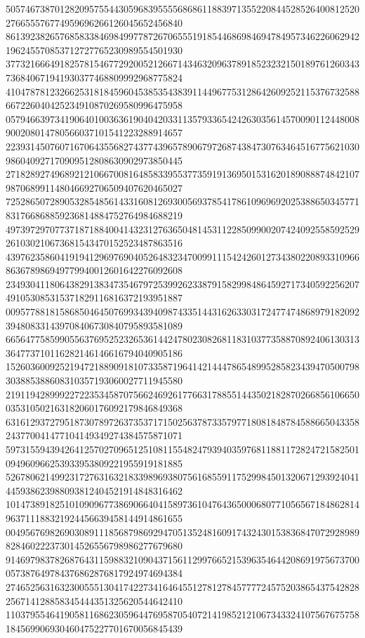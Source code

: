 \begin{DoxyCode}
      505746738701282095755443059683955556868611883971355220844528526400812520276655576774959696266126045652456840
      861392382657685833846984997787267065551918544686984694784957346226062942196245570853712727765230989554501930
      377321666491825781546772920052126671434632096378918523232150189761260343736840671941930377468809992968775824
      410478781232662531818459604538535438391144967753128642609252115376732588667226040425234910870269580996475958
      057946639734190640100363619040420331135793365424263035614570090112448008900208014780566037101541223288914657
      223931450760716706435568274377439657890679726874384730763464516775621030986040927170909512808630902973850445
      271828927496892121066700816485833955377359191369501531620189088874842107987068991148046692706509407620465027
      725286507289053285485614331608126930056937854178610969692025388650345771831766868859236814884752764984688219
      497397297077371871884004143231276365048145311228509900207424092558592529261030210673681543470152523487863516
      439762358604191941296976904052648323470099111542426012734380220893310966863678986949779940012601642276092608
      234930411806438291383473546797253992623387915829984864592717340592256207491053085315371829116816372193951887
      009577881815868504645076993439409874335144316263303172477474868979182092394808331439708406730840795893581089
      665647758599055637695252326536144247802308268118310377358870892406130313364773710116282146146616794040905186
      152603600925219472188909181073358719641421444786548995285823439470500798303885388608310357193060027711945580
      219119428999227223534587075662469261776631788551443502182870266856106650035310502163182060176092179846849368
      631612937279518730789726373537171502563787335797718081848784588665043358243770041477104149349274384575871071
      597315594394264125702709651251081155482479394035976811881172824721582501094960966253933953809221955919181885
      526780621499231727631632183398969380756168559117529984501320671293924041445938623988093812404521914848316462
      101473891825101090967738690664041589736104764365000680771056567184862814963711188321924456639458144914861655
      004956769826903089111856879869294705135248160917432430153836847072928989828460222373014526556798986277679680
      914697983782687643115988321090437156112997665215396354644208691975673700057387649784376862876817924974694384
      274652563163230055513041742273416464551278127845777724575203865437542828256714128858345444351325620544642410
      110379554641905811686230596447695870540721419852121067343324107567675758184569906930460475227701670056845439

\end{DoxyCode}
